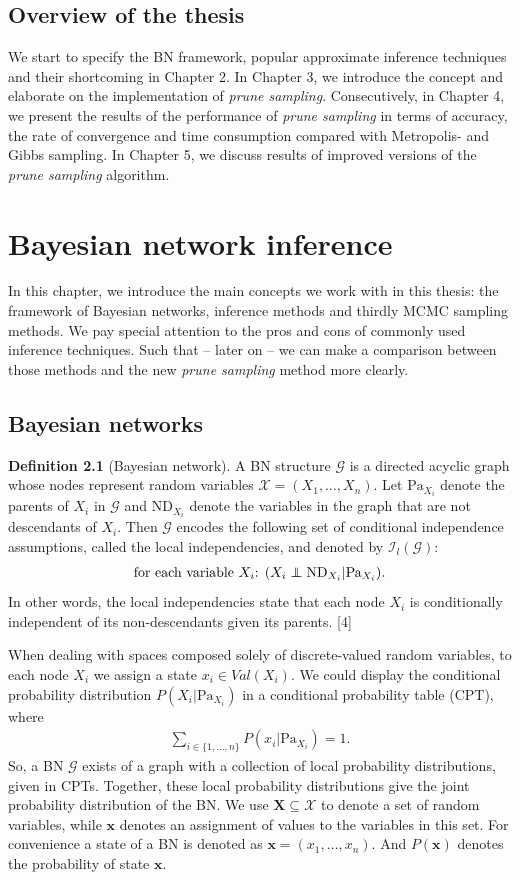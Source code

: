 \documentclass[a4paper, twoside, 11pt]{report}
\theoremstyle{plain}
\theoremstyle{definition}
\newtheorem{definition}[thm]{Definition}
\theoremstyle{remark}
\newcommand{\G}{{\mathcal G}}
\newcommand{\I}{{\mathcal{I}}}
\newcommand{\X}{{\mathcal{X}}}
\newcommand{\ps}{\textit{prune sampling }}
\newcommand{\bfx}{{\mathbf{x}}}
\newcommand{\bfX}{{\mathbf{X}}}
\begin{document}
\section{Overview of the thesis}
We start to specify the BN framework, popular approximate inference techniques and their shortcoming in Chapter 2. In Chapter 3, we introduce the concept and elaborate on the implementation of \textit{prune sampling}. Consecutively, in Chapter 4, we present the results of the performance of \ps in terms of accuracy, the rate of convergence and time consumption compared with Metropolis- and Gibbs sampling. In Chapter 5, we discuss results of improved versions of the \ps algorithm.

\chapter{Bayesian network inference}
In this chapter, we introduce the main concepts we work with in this thesis: the framework of Bayesian networks, inference methods and thirdly MCMC sampling methods. We pay special attention to the pros and cons of commonly used inference techniques. Such that -- later on -- we can make a comparison between those methods and the new \ps method more clearly.

\section{Bayesian networks}
\begin{definition}[Bayesian network]
A BN structure $\G$ is a directed acyclic graph whose nodes represent random variables $\X = (X_1, \ldots , X_n)$. Let $\text{Pa}_{X_i}$ denote the parents of $X_i$ in $\G$ and $\text{ND}_{X_i}$ denote the variables in the graph that are not descendants of $X_i$. Then $\G$ encodes the following set of conditional independence assumptions, called the local independencies, and denoted by $\I_l(\G)$:
\begin{align*}
\text{for each variable $X_i$: $(X_i \indep \text{ND}_{X_i} | \text{Pa}_{X_i})$}.
\end{align*}
In other words, the local independencies state that each node $X_i$ is conditionally independent of its non-descendants given its parents. [4] 
\end{definition}

When dealing with spaces composed solely of discrete-valued random variables, to each node $X_i$ we assign a state $x_i \in Val(X_i)$. We could display the conditional probability distribution $P(X_i | \text{Pa}_{X_i})$ in a conditional probability table (CPT), where
\begin{align*}
\sum_{i \in \{1, \ldots , n\}} P(x_i | \text{Pa}_{X_i}) = 1.
\end{align*}
So, a BN $\G$ exists of a graph with a collection of local probability distributions, given in CPTs. Together, these local probability distributions give the joint probability distribution of the BN. We use $\bfX \subseteq \X$ to denote a set of random variables, while $\bfx$ denotes an assignment of values to the variables in this set. For convenience a state of a BN is denoted as $\bfx = (x_1, \ldots , x_n)$. And $P(\bfx)$ denotes the probability of state $\bfx$.
\end{document}
